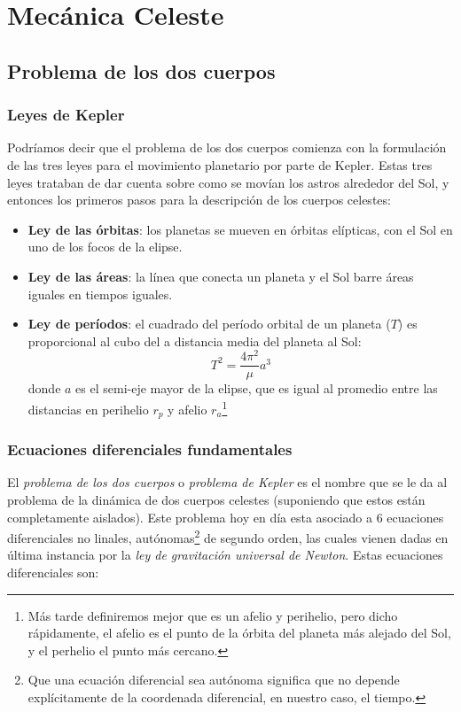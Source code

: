 \chapter{Mecánica Celeste}

\section{Problema de los dos cuerpos}


\subsection{Leyes de Kepler}

Podríamos decir que el problema de los dos cuerpos comienza con la formulación de las tres leyes para el movimiento planetario por parte de Kepler. Estas tres leyes trataban de dar cuenta sobre como se movían los astros alrededor del Sol, y entonces los primeros pasos para la descripción de los cuerpos celestes:

\begin{itemize}
    \item \textbf{Ley de las órbitas}: los planetas se mueven en órbitas elípticas, con el Sol en uno de los focos de la elipse.
    \item \textbf{Ley de las áreas}: la línea que conecta un planeta y el Sol barre áreas iguales en tiempos iguales.
    \item \textbf{Ley de períodos}: el cuadrado del período orbital de un planeta ($T$) es proporcional al cubo del a distancia media del planeta al Sol:
    \begin{equation}
        T^2 = \frac{4\pi^2}{\mu}a^3
    \end{equation}
    donde $a$ es el semi-eje mayor de la elipse, que es igual al promedio entre las distancias en perihelio $r_p$ y afelio $r_a$\footnote{Más tarde definiremos mejor que es un afelio y perihelio, pero dicho rápidamente, el afelio es el punto de la órbita del planeta más alejado del Sol, y el perhelio el punto más cercano.}
\end{itemize}

\subsection{Ecuaciones diferenciales fundamentales}

El \textit{problema de los dos cuerpos} o \textit{problema de Kepler} es el nombre que se le da al problema de la dinámica de dos cuerpos celestes (suponiendo que estos están completamente aislados). Este problema hoy en día esta asociado a 6 ecuaciones diferenciales no linales, autónomas\footnote{Que una ecuación diferencial sea autónoma significa que no depende explícitamente de la coordenada diferencial, en nuestro caso, el tiempo.} de segundo orden, las cuales vienen dadas en última instancia por la \textit{ley de gravitación universal de Newton}. Estas ecuaciones diferenciales son:

